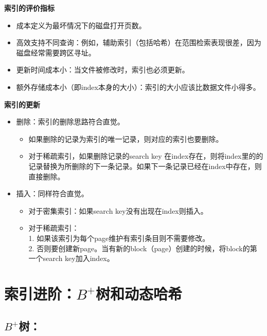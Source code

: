 \documentclass[b5paper, twoside]{article}
\let\oldtextbf\textbf
\renewcommand{\textbf}[1]{\textcolor{myblue}{\oldtextbf{#1}}}
\begin{document}
\textbf{索引的评价指标}
\begin{itemize}
    \item 成本定义为最坏情况下的磁盘打开页数。
    \item 高效支持不同查询：例如，辅助索引（包括哈希）在范围检索表现很差，因为磁盘经常需要跨区寻址。
    \item 更新时间成本小：当文件被修改时，索引也必须更新。
    \item 额外存储成本小（即index本身的大小）：索引的大小应该比数据文件小得多。
\end{itemize}

\textbf{索引的更新}
\begin{itemize}
    \item 删除：索引的删除思路符合直觉。
    \begin{itemize}
        \item 如果删除的记录为索引的唯一记录，则对应的索引也要删除。
        \item 对于稀疏索引，如果删除记录的search key 在index存在，则将index里的的记录替换为所删除的下一条记录。如果下一条记录已经在index中存在，则直接删除。
    \end{itemize}
    \item 插入：同样符合直觉。
    \begin{itemize}
        \item 对于密集索引：如果search key没有出现在index则插入。
        \item 对于稀疏索引：
        \\1. 如果该索引为每个page维护有索引条目则不需要修改。
        \\2. 否则要创建新page。当有新的block（page）创建的时候，将block的第一个search key加入index。
    \end{itemize}
\end{itemize}

\section{索引进阶：$B^+$树和动态哈希}

\subsection{$B^+$树：}
\end{document}
